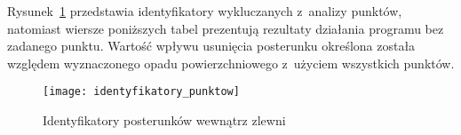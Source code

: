 Rysunek~\ref{fig:numery_posterunkow} przedstawia identyfikatory wykluczanych z~analizy punktów, natomiast wiersze poniższych tabel prezentują rezultaty działania programu bez zadanego punktu. Wartość wpływu usunięcia posterunku określona została względem wyznaczonego opadu powierzchniowego z~użyciem wszystkich punktów.

\begin{figure}[!ht]
	\label{fig:numery_posterunkow}
	\caption{Identyfikatory posterunków wewnątrz zlewni}
	\centering
	\texttt{[image: identyfikatory\_punktow]}
\end{figure}



